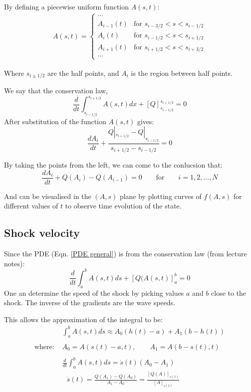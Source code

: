 \documentclass[12pt]{article}
\begin{document}
By defining a piecewise uniform function $A(s, t)$:
\begin{align*}
A(s,t) = \begin{cases}
\cdots \\
A_{i-1}(t) & \text{for } s_{i-3/2} < s < s_{i-1/2} \\
A_i(t) & \text{for } s_{i-1/2} < s < s_{i+1/2} \\
A_{i+1}(t) & \text{for } s_{i+1/2} < s < s_{i+3/2} \\
\cdots
\end{cases}
\end{align*}

Where $s_{i\pm1/2}$ are the half points, and $A_i$ is the region between half points.

We say that the conservation law, 
\begin{equation}
    \frac{d}{dt}\int_{s_{i - 1/2}}^{s_{i + 1/2}}A(s, t)dx + [Q]_{s_{i - 1/2}}^{s_{i + 1/2}} = 0
\end{equation}
After substitution of the function $A(s, t)$ gives:
\begin{equation}
    \frac{dA_i}{dt} + \frac{Q|_{s_{i + 1/2}} - Q|_{s_{i - 1/2}}}{s_{i + 1/2}- s_{i - 1/2}} = 0
\end{equation}

By taking the points from the left, we can come to the conlucsion that:
\begin{equation}
    \frac{dA_i}{dt} + Q(A_i) - Q(A_{i-1}) = 0 \qquad \text{for} \qquad i = 1, 2, ..., N
\end{equation}

And can be visualised in the $(A, s)$ plane by plotting curves of $f(A, s)$ for different values of $t$ to observe time evolution of the state.

\subsection{Shock velocity}
\label{sec:shock_velocity}
Since the PDE (Eqn. \ref{PDE general}) is from the conservation law (from lecture notes):
\begin{equation}
    \frac{d}{dt}\int_a^b A(s, t)ds + [Q(A(s, t)]_a^b = 0
    \label{eqn:conservation_law_oint}
\end{equation}
One an determine the speed of the shock by picking values $a$ and $b$ close to the shock. The inverse of the gradients are the wave speeds. 

This allows the approximation of the integral to be:
\begin{equation}
    \begin{split}
        &\int_a^b A(s, t)ds \approx A_0 (h(t) - a) + A_1(b - h(t))
        \\
    \\ \text{where: }& A_0 = A(s(t)-a, t), \qquad A_1 = A(b - s(t),t)
    \\
    \\ &\frac{d}{dt}\int_a^b A(s, t)ds = \dot s(t)(A_0 - A_1)
    \\ &\boxed{\text{ }\dot s(t) = \frac{Q(A_1)- Q(A_0)}{A_1 - A_0} = \frac{[Q(A)]_{s(t)}}{[A]_{s(t)}}\text{ }}
    \end{split}
\end{equation}
\end{document}
